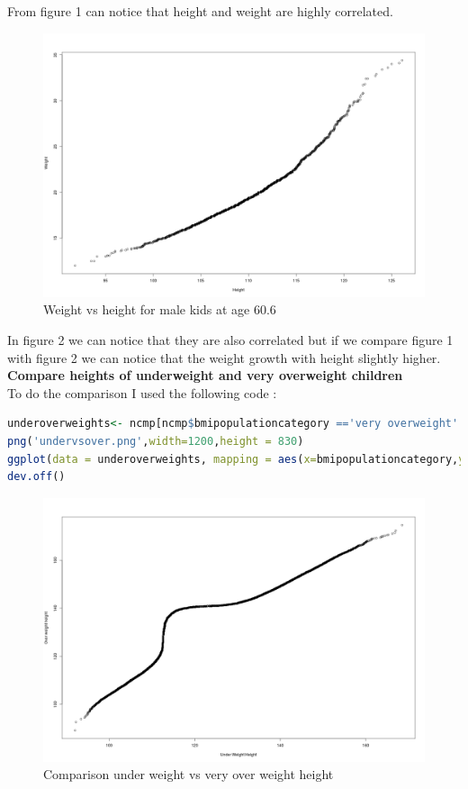 \documentclass{article}
\begin{document}
From figure 1 can notice that height and weight are highly correlated.
\begin{figure}[H]
	\includegraphics[scale=0.4]{female.png}
	\caption{Weight vs height for male kids at age 60.6}
\end{figure}
In figure 2 we can notice that they are also correlated but if we compare figure 1 with figure 2 we can notice that the weight growth with height slightly higher.\\
\textbf{Compare heights of underweight and very overweight children }\\
To do the comparison I used the following code : 
\begin{lstlisting}[language=R]
underoverweights<- ncmp[ncmp$bmipopulationcategory =='very overweight' | ncmp$bmipopulationcategory=='underweight' ,]
png('undervsover.png',width=1200,height = 830)
ggplot(data = underoverweights, mapping = aes(x=bmipopulationcategory,y=height))+geom_point()
dev.off()
\end{lstlisting}
\begin{figure}[H]
\includegraphics[scale = 0.4]{undervsover.png}
\caption{Comparison under weight vs very over weight height }
\end{figure}
\end{document}
